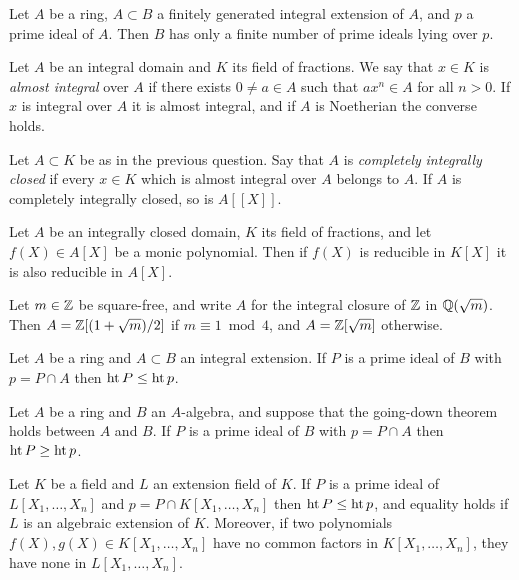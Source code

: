 \begin{exercise}\label{ex:9.3-ex}
Let $A$ be a ring, $A \subset B$ a finitely generated integral extension of $A$, and $p$ a
prime ideal of $A$. Then $B$ has only a finite number of prime ideals lying over
$p$.
\end{exercise}

\begin{exercise}\label{ex:9.4-ex}
Let $A$ be an integral domain and $K$ its field of fractions. We say that $x \in K$ is
\emph{almost integral} over $A$ if there exists $0 \neq a \in A$ such that $ax^n \in A$ for all $n > 0$.
If $x$ is integral over $A$ it is almost integral, and if $A$ is Noetherian the
converse holds.
\end{exercise}

\begin{exercise}\label{ex:9.5-ex}
Let $A \subset K$ be as in the previous question. Say that $A$ is \emph{completely}
\emph{integrally closed} if every $x \in K$ which is almost integral over $A$ belongs to $A$.
If $A$ is completely integrally closed, so is $A[[X]]$.
\end{exercise}

\begin{exercise}\label{ex:9.6-ex}
Let $A$ be an integrally closed domain, $K$ its field of fractions, and let
$f(X) \in A[X]$ be a monic polynomial. Then if $f(X)$ is reducible in $K[X]$ it is
also reducible in $A[X]$.
\end{exercise}

\begin{exercise}\label{ex:9.7-ex}
Let $m \in \mathbb{Z}$ be square-free, and write $A$ for the integral closure of $\mathbb{Z}$ in
$\mathbb{Q}(\sqrt{m})$. Then $A = \mathbb{Z}[(1 + \sqrt{m})/2]$ if $m \equiv 1 \bmod 4$, and $A =
\mathbb{Z}[\sqrt{m}]$ otherwise.
\end{exercise}

\begin{exercise}\label{ex:9.8-ex}
Let $A$ be a ring and $A \subset B$ an integral extension. If $P$ is a prime ideal of $B$
with $p = P \cap A$ then $\operatorname{ht} P \le \operatorname{ht} p$.
\end{exercise}

\begin{exercise}\label{ex:9.9-ex}
Let $A$ be a ring and $B$ an $A$-algebra, and suppose that the going-down
theorem holds between $A$ and $B$. If $P$ is a prime ideal of $B$ with $p = P \cap A$
then $\operatorname{ht} P \ge \operatorname{ht} p$.
\end{exercise}

\begin{exercise}\label{ex:9.10-ex}
Let $K$ be a field and $L$ an extension field of $K$. If $P$ is a prime ideal of
$L[X_1, \ldots, X_n]$ and $p = P \cap K[X_1, \ldots, X_n]$ then $\operatorname{ht} P \le \operatorname{ht} p$, and equality
holds if $L$ is an algebraic extension of $K$. Moreover, if two polynomials
$f(X), g(X) \in K[X_1, \ldots, X_n]$ have no common factors in $K[X_1, \ldots, X_n]$,
they have none in $L[X_1, \ldots, X_n]$.
\end{exercise}

